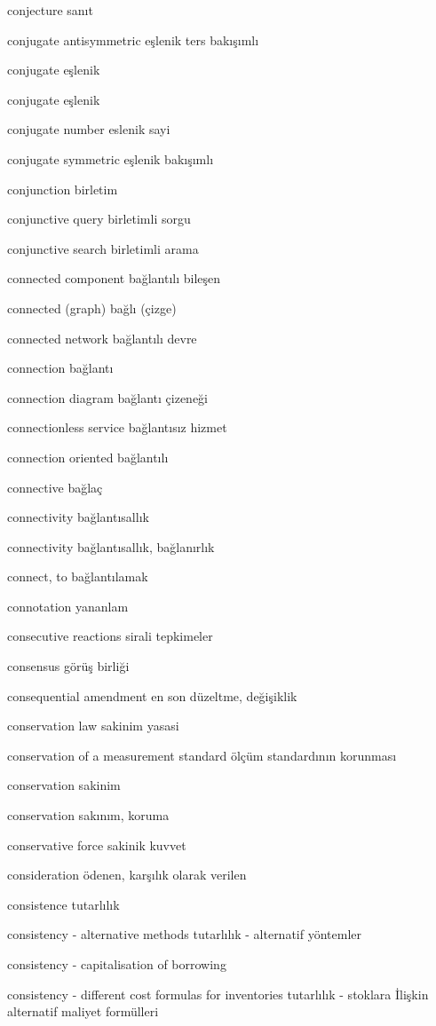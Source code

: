\documentclass[12pt,fleqn]{article}\usepackage{../../common}
\begin{document}
conjecture sanıt

conjugate antisymmetric eşlenik ters bakışımlı

conjugate eşlenik

conjugate eşlenik

conjugate number eslenik sayi

conjugate symmetric eşlenik bakışımlı

conjunction birletim

conjunctive query birletimli sorgu

conjunctive search birletimli arama

connected component bağlantılı bileşen

connected (graph) bağlı (çizge)

connected network bağlantılı devre

connection bağlantı

connection diagram bağlantı çizeneği

connectionless service bağlantısız hizmet

connection oriented bağlantılı

connective bağlaç

connectivity bağlantısallık

connectivity bağlantısallık, bağlanırlık

connect, to bağlantılamak

connotation yananlam

consecutive reactions sirali tepkimeler

consensus görüş birliği

consequential amendment en son düzeltme, değişiklik

conservation law sakinim yasasi

conservation of a measurement standard ölçüm standardının korunması

conservation sakinim

conservation sakınım, koruma

conservative force sakinik kuvvet

consideration ödenen, karşılık olarak verilen

consistence tutarlılık

consistency - alternative methods tutarlılık - alternatif yöntemler

consistency - capitalisation of borrowing

consistency - different cost formulas for inventories tutarlılık - stoklara İlişkin alternatif maliyet formülleri
\end{document}
